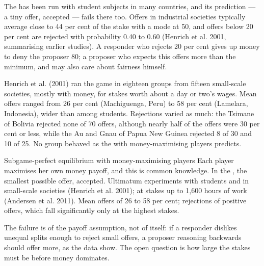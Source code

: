 The  has been run with student subjects in many countries, and its prediction --- a tiny
offer, accepted --- fails there too.
Offers in industrial societies typically average close to 44 per cent of the stake with a mode at 50, and
offers below 20 per cent are rejected with probability 0.40 to 0.60 (Henrich et al. 2001, summarising earlier
studies). A responder who rejects 20 per cent gives up money to deny the proposer 80; a proposer who expects
this offers more than the minimum, and may also care about fairness himself.

\begin{record}
Henrich et al. (2001) ran the game in eighteen groups from fifteen small-scale societies, mostly with money,
for stakes worth about a day or two's wages. Mean offers ranged from 26 per cent (Machiguenga, Peru) to 58 per
cent (Lamelara, Indonesia), wider than among students. Rejections varied as much: the Tsimane of Bolivia
rejected none of 70 offers, although nearly half of the offers were 30 per cent or less, while the Au and Gnau
of Papua New Guinea rejected 8 of 30 and 10 of 25. No group behaved as the  with
money-maximising players predicts.
\end{record}

\begin{model}{Subgame-perfect equilibrium with money-maximising players}
\assumes Each player maximises her own money payoff, and this is common knowledge.
\predicts In the , the smallest possible offer, accepted.
\tested Ultimatum experiments with students and in small-scale societies (Henrich et al. 2001); at stakes up to
1{,}600 hours of work (Andersen et al. 2011).
\breaks Mean offers of 26 to 58 per cent; rejections of positive offers, which fall significantly only at the highest
stakes.
\end{model}

The failure is of the payoff assumption, not of  itself: if a responder dislikes unequal
splits enough to reject small offers, a proposer reasoning backwards should offer more, as the data show. The
open question is how large the stakes must be before money dominates.

